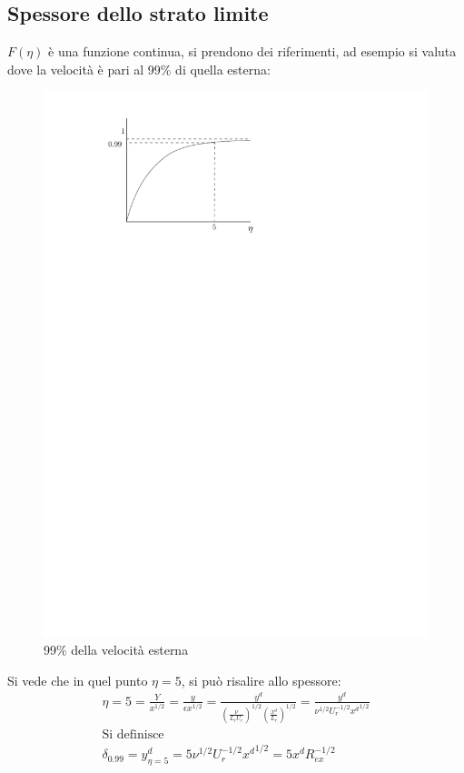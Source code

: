 \subsection{Spessore dello strato limite}
$F(\eta)$ è una funzione continua, si prendono dei riferimenti, ad esempio si valuta dove la velocità è pari al 99\% di quella esterna:
	\begin{figure}[ht]
		\includegraphics[scale=0.8]{./7.4 Strato limite/7.4-5}
		\centering
		\caption{99\% della velocità esterna}
	\end{figure}
%
Si vede che in quel punto $\eta = 5$, si può risalire allo spessore:
%
	\begin{equation*}
		\begin{gathered}
		\eta = 5 = \frac{Y}{x^{1/2}} = \frac{y}{\epsilon x^{1/2}} = \frac{y^d}{ {\left( \frac{\nu}{L_r U_r} \right)}^{1/2} {\left( \frac{x^d}{L_r} \right)}^{1/2}  } = \frac{y^d}{\nu^{1/2} U_r^{-1/2} {x^d}^{1/2} }\\
		\text{Si definisce}\\
		\delta_{0.99} = y^d_{\eta = 5} = 5 \nu^{1/2} U_r^{-1/2} {x^d}^{1/2} = 5 x^d R_{ex}^{-1/2}
		\end{gathered}
	\end{equation*}
